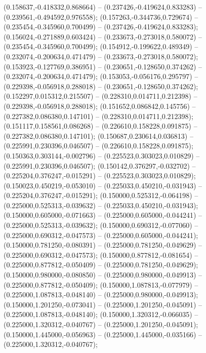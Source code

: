  (0.158637,-0.418332,0.868664) -- (0.237426,-0.419624,0.833283) -- (0.239561,-0.494592,0.976558);
 (0.157263,-0.344736,0.729674) -- (0.235454,-0.345960,0.700499) -- (0.237426,-0.419624,0.833283);
 (0.156024,-0.271889,0.603424) -- (0.233673,-0.273018,0.580072) -- (0.235454,-0.345960,0.700499);
 (0.154912,-0.199622,0.489349) -- (0.232074,-0.200634,0.471479) -- (0.233673,-0.273018,0.580072);
 (0.153923,-0.127769,0.386951) -- (0.230651,-0.128650,0.374262) -- (0.232074,-0.200634,0.471479);
 (0.153053,-0.056176,0.295797) -- (0.229398,-0.056918,0.288018) -- (0.230651,-0.128650,0.374262);
 (0.152297,0.015312,0.215507) -- (0.228310,0.014711,0.212398) -- (0.229398,-0.056918,0.288018);
 (0.151652,0.086842,0.145756) -- (0.227382,0.086380,0.147101) -- (0.228310,0.014711,0.212398);
 (0.151117,0.158561,0.086268) -- (0.226610,0.158228,0.091875) -- (0.227382,0.086380,0.147101);
 (0.150687,0.230614,0.036813) -- (0.225991,0.230396,0.046507) -- (0.226610,0.158228,0.091875);
 (0.150363,0.303144,-0.002796) -- (0.225523,0.303023,0.010829) -- (0.225991,0.230396,0.046507);
 (0.150142,0.376297,-0.032702) -- (0.225204,0.376247,-0.015291) -- (0.225523,0.303023,0.010829);
 (0.150023,0.450219,-0.053010) -- (0.225033,0.450210,-0.031943) -- (0.225204,0.376247,-0.015291);
 (0.150000,0.525312,-0.064198) -- (0.225000,0.525313,-0.039632) -- (0.225033,0.450210,-0.031943);
 (0.150000,0.605000,-0.071663) -- (0.225000,0.605000,-0.044241) -- (0.225000,0.525313,-0.039632);
 (0.150000,0.690312,-0.077060) -- (0.225000,0.690312,-0.047573) -- (0.225000,0.605000,-0.044241);
 (0.150000,0.781250,-0.080391) -- (0.225000,0.781250,-0.049629) -- (0.225000,0.690312,-0.047573);
 (0.150000,0.877812,-0.081654) -- (0.225000,0.877812,-0.050409) -- (0.225000,0.781250,-0.049629);
 (0.150000,0.980000,-0.080850) -- (0.225000,0.980000,-0.049913) -- (0.225000,0.877812,-0.050409);
 (0.150000,1.087813,-0.077979) -- (0.225000,1.087813,-0.048140) -- (0.225000,0.980000,-0.049913);
 (0.150000,1.201250,-0.073041) -- (0.225000,1.201250,-0.045091) -- (0.225000,1.087813,-0.048140);
 (0.150000,1.320312,-0.066035) -- (0.225000,1.320312,-0.040767) -- (0.225000,1.201250,-0.045091);
 (0.150000,1.445000,-0.056963) -- (0.225000,1.445000,-0.035166) -- (0.225000,1.320312,-0.040767);
